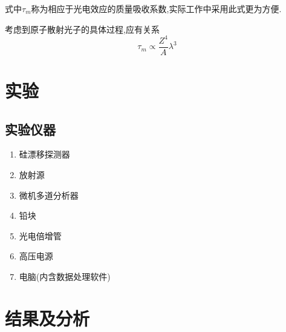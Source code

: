 \documentclass[a4paper]{article}
\begin{document}
式中$\tau_m$称为相应于光电效应的质量吸收系数,实际工作中采用此式更为方便.

考虑到原子散射光子的具体过程,应有关系
\begin{equation}
    \tau_m \propto \frac{Z^4}{A}\lambda^3
\end{equation}
\newpage
\section{实验} \label{experiment}%

\subsection{实验仪器}
\begin{enumerate}[(1)]
    \item 硅漂移探测器
    \item 放射源
    \item 微机多道分析器
    \item 铅块
    \item 光电倍增管
    \item 高压电源
    \item 电脑(内含数据处理软件)
\end{enumerate}

\newpage
\section{结果及分析}
\end{document}
